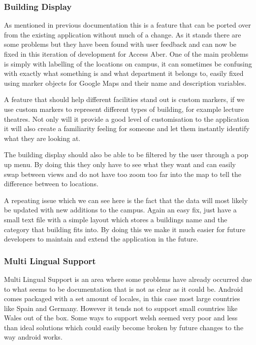 \documentclass[10pt,a4paper]{article}
\begin{document}
\subsubsection{Building Display}
As mentioned in previous documentation this is a feature that can be ported over from the existing application without much of a change. As it stands there are some problems but they have been found with user feedback and can now be fixed in this iteration of development for Access Aber. One of the main problems is simply with labelling of the locations on campus, it can sometimes be confusing with exactly what something is and what department it belongs to, easily fixed using marker objects for Google Maps and their name and description variables. 

A feature that should help different facilities stand out is custom markers, if we use custom markers to represent different types of building, for example lecture theatres. Not only will it provide a good level of customisation to the application it will also create a familiarity feeling for someone and let them instantly identify what they are looking at. 

The building display should also be able to be filtered by the user through a pop up menu. By doing this they only have to see what they want and can easily swap between views and do not have too zoom too far into the map to tell the difference between to locations. 

A repeating issue which we can see here is the fact that the data will most likely be updated with new additions to the campus. Again an easy fix, just have a small text file with a simple layout which stores a buildings name and the category that building fits into. By doing this we make it much easier for future developers to maintain and extend the application in the future. 

\subsubsection{Multi Lingual Support}
Multi Lingual Support is an area where some problems have already occurred due to what seems to be documentation that is not as clear as it could be. Android comes packaged with a set amount of locales, in this case most large countries like Spain and Germany. However it tends not to support small countries like Wales out of the box. Some ways to support welsh seemed very poor and less than ideal solutions which could easily become broken by future changes to the way android works.
\end{document}
